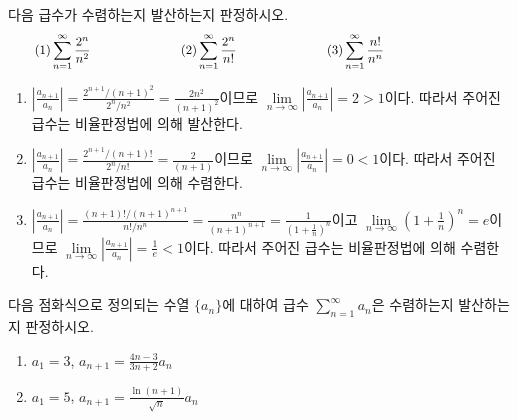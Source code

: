 \documentclass[11pt, a4paper]{book}
\begin{document}
\vspace{1em}
\begin{example}
	다음 급수가 수렴하는지 발산하는지 판정하시오.
	\begin{equation*}
		\qquad (1) \sum_{n=1}^{\infty} \frac{2^{n}}{n^{2}} \hspace{2.5cm} (2) \sum_{n=1}^{\infty} \frac{2^n}{n!} \hspace{2.5cm} (3) \sum_{n=1}^{\infty}\frac{n!}{n^{n}} \hspace{3.5cm}
	\end{equation*}
	\begin{solution}
		\begin{enumerate}[label=(\arabic*)]
			\item $\left|\frac{a_{n+1}}{a_{n}}\right|=\frac{2^{n+1}/(n+1)^{2}}{2^{n}/n^{2}}=\frac{2n^2}{(n+1)^2}$이므로 $\lim\limits_{n \to \infty}\left|\frac{a_{n+1}}{a_{n}}\right|=2>1$이다. 따라서 주어진 급수는 비율판정법에 의해 발산한다.
			\item $\left|\frac{a_{n+1}}{a_{n}}\right|=\frac{2^{n+1}/(n+1)!}{2^{n}/n!}=\frac{2}{(n+1)}$이므로 $\lim\limits_{n \to \infty}\left|\frac{a_{n+1}}{a_{n}}\right|=0<1$이다. 따라서 주어진 급수는 비율판정법에 의해 수렴한다.
			\item $\left|\frac{a_{n+1}}{a_{n}}\right|=\frac{(n+1)!/(n+1)^{n+1}}{n!/n^{n}}=\frac{n^{n}}{(n+1)^{n+1}} =\frac{1}{\left(1+\frac{1}{n}\right)^n}$이고 $\lim\limits_{n \to \infty}\left(1+\frac{1}{n}\right)^{n}=e$이므로 $\lim\limits_{n \to \infty}\left|\frac{a_{n+1}}{a_{n}}\right|=\frac{1}{e}<1$이다. 따라서 주어진 급수는 비율판정법에 의해 수렴한다.
		\end{enumerate}
	\end{solution}
\end{example}
\vspace{1em}
\begin{problem}
	다음 점화식으로 정의되는 수열 $\{a_n\}$에 대하여 급수  $\displaystyle \sum_{n=1}^{\infty}a_{n}$은 수렴하는지 발산하는지 판정하시오.
	\begin{enumerate}[label=(\arabic*)]
		\item $a_1 =3$, $a_{n+1} =\frac{4n-3}{3n+2} a_{n}$
		\item $a_1 = 5$, $a_{n+1} =\frac{\ln (n+1)}{\sqrt{n}}a_n$
	\end{enumerate}
\end{problem}
\end{document}
